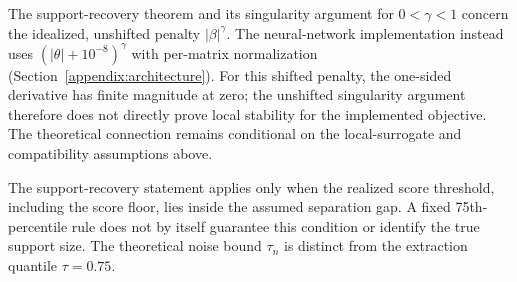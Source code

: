 \documentclass{article}
\begin{document}
The support-recovery theorem and its singularity argument for $0<\gamma<1$ concern the idealized, unshifted penalty $|\beta|^\gamma$. The neural-network implementation instead uses $(|\theta|+10^{-8})^\gamma$ with per-matrix normalization (Section~\ref{appendix:architecture}). For this shifted penalty, the one-sided derivative has finite magnitude at zero; the unshifted singularity argument therefore does not directly prove local stability for the implemented objective. The theoretical connection remains conditional on the local-surrogate and compatibility assumptions above.

The support-recovery statement applies only when the realized score threshold, including the score floor, lies inside the assumed separation gap. A fixed 75th-percentile rule does not by itself guarantee this condition or identify the true support size. The theoretical noise bound $\tau_n$ is distinct from the extraction quantile $\tau=0.75$.
\end{document}
